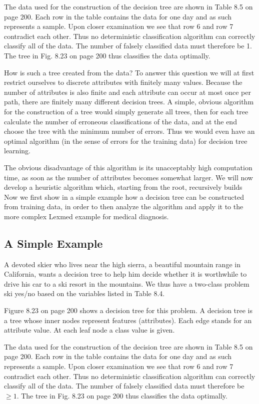\documentclass[10pt]{book}
\begin{document}
The data used for the construction of the decision tree are shown in Table 8.5 on page 200. Each row in the table contains the data for one day and as such represents a sample. Upon closer examination we see that row 6 and row 7 contradict each other. Thus no deterministic classification algorithm can correctly classify all of the data. The number of falsely classified data must therefore be  1. The tree in Fig. 8.23 on page 200 thus classifies the data optimally.

How is such a tree created from the data? To answer this question we will at first restrict ourselves to discrete attributes with finitely many values. Because the number of attributes is also finite and each attribute can occur at most once per path, there are finitely many different decision trees. A simple, obvious algorithm for the construction of a tree would simply generate all trees, then for each tree calculate the number of erroneous classifications of the data, and at the end choose the tree with the minimum number of errors. Thus we would even have an optimal algorithm (in the sense of errors for the training data) for decision tree learning.

The obvious disadvantage of this algorithm is its unacceptably high computation time, as soon as the number of attributes becomes somewhat larger. We will now develop a heuristic algorithm which, starting from the root, recursively builds
Now we first show in a simple example how a decision tree can be constructed from training data, in order to then analyze the algorithm and apply it to the more complex Lexmed example for medical diagnosis.

\subsection{A Simple Example}
A devoted skier who lives near the high sierra, a beautiful mountain range in California, wants a decision tree to help him decide whether it is worthwhile to drive his car to a ski resort in the mountains. We thus have a two-class problem ski yes/no based on the variables listed in Table 8.4.

Figure 8.23 on page 200 shows a decision tree for this problem. A decision tree is a tree whose inner nodes represent features (attributes). Each edge stands for an attribute value. At each leaf node a class value is given.

The data used for the construction of the decision tree are shown in Table 8.5 on page 200. Each row in the table contains the data for one day and as such represents a sample. Upon closer examination we see that row 6 and row 7 contradict each other. Thus no deterministic classification algorithm can correctly classify all of the data. The number of falsely classified data must therefore be $\geq 1$. The tree in Fig. 8.23 on page 200 thus classifies the data optimally.
\end{document}
